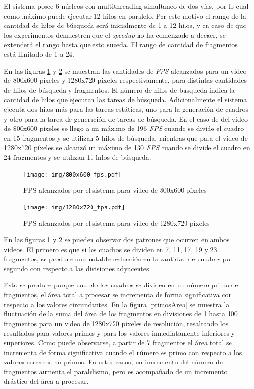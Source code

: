 El sistema posee 6 núcleos con multithreading simultaneo de dos vías, por lo
cual como máximo puede ejecutar 12 hilos en paralelo. Por este motivo el rango
de la cantidad de hilos de búsqueda será inicialmente de 1 a 12 hilos, y en caso
de que los experimentos demuestren que el \emph{speedup} no ha comenzado a
decaer, se extenderá el rango hasta que esto suceda. El rango de cantidad de
fragmentos está limitado de 1 a 24.

En las figuras \ref{800fps} y \ref{1280fps} se muestran las cantidades de
\emph{FPS} alcanzados para un video de 800x600 píxeles y 1280x720 píxeles
respectivamente, para distintas cantidades de hilos de búsqueda y fragmentos.
El número de hilos de búsqueda indica la cantidad de hilos que ejecutan las
tareas de búsqueda. Adicionalmente el sistema ejecuta dos hilos más para las
tareas estáticas, uno para la generación de cuadros y otro para la tarea de
generación de tareas de búsqueda. En el caso de del video de 800x600 píxeles se
llego a un máximo de 196 \emph{FPS} cuando se divide el cuadro en 15 fragmentos
y se utilizan 5 hilos de búsqueda, mientras que para el video de 1280x720
píxeles se alcanzó un máximo de 130 \emph{FPS} cuando se divide el cuadro en 24
fragmentos y se utilizan 11 hilos de búsqueda.

\begin{figure}[!htb]

	\texttt{[image: img/800x600\_fps.pdf]}
	\caption{FPS alcanzados por el sistema para video de 800x600 píxeles}
	\label{800fps}

\end{figure}

\begin{figure}[!htb]

	\texttt{[image: img/1280x720\_fps.pdf]}
	\caption{FPS alcanzados por el sistema para video de 1280x720 píxeles}
	\label{1280fps}

\end{figure}

En las figuras \ref{800fps} y \ref{1280fps} se pueden observar dos patrones que
ocurren en ambos videos. El primero es que si los cuadros se dividen en 7, 11,
17, 19 y 23 fragmentos, se produce una notable reducción en la cantidad de
cuadros por segundo con respecto a las divisiones adyacentes.

Esto se produce porque cuando los cuadros se dividen en un número primo de
fragmentos, el área total a procesar se incrementa de forma significativa con
respecto a los valores circundantes. En la figura \ref{primosArea} se muestra la
fluctuación de la suma del área de los fragmentos en divisiones de 1 hasta 100
fragmentos para un video de 1280x720 píxeles de resolución, resaltando los
resultados para valores primos y para los valores inmediatamente inferiores y
superiores. Como puede observarse, a partir de 7 fragmentos el área total se
incrementa de forma significativa cuando el número es primo con respecto a los
valores cercanos no primos. En estos casos, un incremento del número de
fragmentos aumenta el paralelismo, pero es acompañado de un incremento drástico
del área a procesar.

